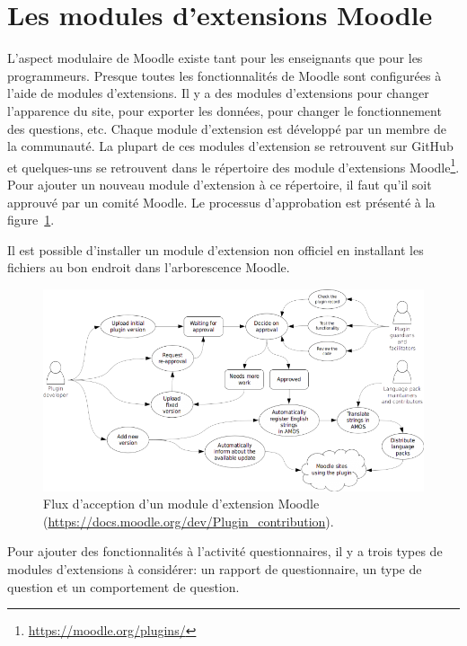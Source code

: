 \section{Les modules d'extensions Moodle}
L'aspect modulaire de Moodle existe tant pour les enseignants que pour les programmeurs.
Presque toutes les fonctionnalit\'es de Moodle sont configur\'ees \`a l'aide de modules d'extensions.
Il y a des modules d'extensions pour changer l'apparence du site, pour exporter les donn\'ees, pour changer le fonctionnement des questions, etc.
Chaque module d'extension est d\'evelopp\'e par un membre de la communaut\'e.
La plupart de ces modules d'extension se retrouvent sur GitHub et quelques-uns se retrouvent dans le r\'epertoire des module d'extensions Moodle\footnote{\url{https://moodle.org/plugins/}}.
Pour ajouter un nouveau module d'extension \`a ce r\'epertoire, il faut qu'il soit approuv\'e par un comit\'e Moodle.
Le processus d'approbation est pr\'esent\'e \`a la figure~\ref{plugin-workflow}.

Il est possible d'installer un module d'extension non officiel en installant les fichiers au bon endroit dans l'arborescence Moodle.
\begin{figure}[h!]
  \includegraphics[scale=0.7]{images/plugin-contribution-workflow.png}
  \caption[Flux d'acception d'un module d'extension Moodle]{Flux d'acception d'un module d'extension Moodle (\href{https://docs.moodle.org/dev/Plugin_contribution}{\url{https://docs.moodle.org/dev/Plugin\_contribution}}).}
  \label{plugin-workflow}
\end{figure}
Pour ajouter des fonctionnalit\'es \`a l'activit\'e questionnaires, il y a trois types de modules d'extensions \`a consid\'erer: un rapport de questionnaire, un type de question et un comportement de question.

